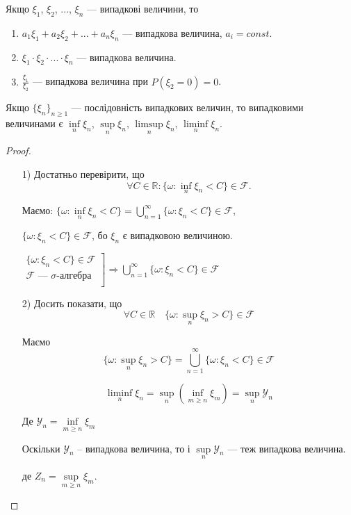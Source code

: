 \begin{corollary}
    
\end{corollary}
Якщо $\xi_1$, $\xi_2$, ..., $\xi_n$ --- випадкові величини, то
\begin{enumerate}
    \item $a_1 \xi_1 + a_2 \xi_2 + ... + a_n \xi_n$ --- випадкова величина, $a_i = const$.
    \item $\xi_1 \cdot \xi_2 \cdot ... \cdot \xi_n$ --- випадкова величина.
    \item $\frac{\xi_1}{\xi_2}$ --- випадкова величина при $P(\xi_2 = 0) = 0$.
\end{enumerate}

\begin{theorem}
    Якщо $\{\xi_n\}_{n \geqslant 1}$ --- послідовність випадкових величин, то 
    випадковими величинами є $\inf\limits_{n} \xi_n$, $\sup\limits_{n} \xi_n$,
    $\limsup\limits_{n} \xi_n$, $\liminf\limits_{n} \xi_n$.    
\end{theorem}
\begin{proof}
    \begin{itemize}
        \item[1)] Достатньо перевірити, що
        $$\forall C \in \mathbb{R}: \{\omega: \inf\limits_{n} \xi_n < C\} \in \mathcal{F}.$$
        
        Маємо:
        $\{\omega: \inf\limits_n \xi_n < C\}
        = \bigcup\limits_{n=1}^{\infty} \{\omega: \xi_n < C\} \in \mathcal{F}$,
        
        $\{\omega: \xi_n < C\} \in \mathcal{F}$, бо $\xi_n$ є випадковою величиною.
        
        $\left. \begin{array}{l}
            \{\omega: \xi_n < C\} \in \mathcal{F} \\
            \mathcal{F} \text{ --- } \sigma\text{-алгебра} \\    
        \end{array} \right] \Rightarrow
        \bigcup\limits_{n=1}^{\infty} \{\omega: \xi_n < C\} \in \mathcal{F}$
        
        
        \item[2)] Досить показати, що
        $$\forall C \in \mathbb{R} \quad \{\omega: \sup\limits_{n} \xi_n > C\} \in \mathcal{F}$$
        
        Маємо 
        $$\{\omega: \sup\limits_{n} \xi_n > C\}
        = \bigcup\limits_{n=1}^{\infty} \{\omega: \xi_n < C\} \in \mathcal{F}$$
        
        $$\liminf_{n} \xi_n
        = \sup\limits_{n} (\inf\limits_{m \geqslant n} \xi_m)
        = \sup\limits_{n} \mathcal{Y}_n$$
        
        Де $\mathcal{Y}_n = \inf\limits_{m \geqslant n} \xi_m$
        
        Оскільки $\mathcal{Y}_n$ -- випадкова величина, то і
        $\sup\limits_{n} \mathcal{Y}_n$ --- теж випадкова величина.
        
        де $Z_n = \sup\limits_{m \geqslant n} \xi_m$. 
    \end{itemize}    
\end{proof}

